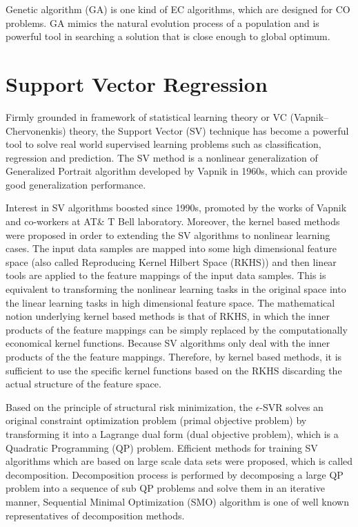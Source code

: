  Genetic algorithm (GA) is one kind of EC algorithms, which are designed for CO problems. GA mimics the natural evolution process of a population and is powerful tool in searching a solution that is close enough to global optimum\cite{Goldberg:1989:GAS:534133}.
 
 \section{Support Vector Regression}
 
 Firmly grounded in framework of statistical learning theory or VC (Vapnik--Chervonenkis) theory, the Support Vector (SV) technique has become a powerful tool to solve real world supervised learning problems such as classification, regression and prediction. The SV method is a nonlinear generalization of Generalized Portrait algorithm developed by Vapnik in 1960s\cite{vapnik1963pattern}\cite{vapnik1964note}, which can provide good generalization performance\cite{scholkopf2002learning}.

Interest in SV algorithms boosted since 1990s, promoted by the works of Vapnik and co-workers at AT\& T Bell laboratory\cite{boser1992training}\cite{guyon1993automatic}\cite{vapnik2013nature}\cite{cortes1995support}\cite{scholkopf1996incorporating}\cite{vapnik1996support}.
Moreover, the kernel based methods\cite{scholkopf2002learning} were proposed in order to extending the SV algorithms to nonlinear learning cases. The input data samples are mapped into some high dimensional feature space (also called Reproducing Kernel Hilbert Space (RKHS)) and then linear tools are applied to the feature mappings of the input data samples. This is equivalent to transforming the nonlinear learning tasks in the original space into the linear learning tasks in high dimensional feature space. The mathematical notion underlying kernel based methods is that of RKHS\cite{scholkopf2002learning}, in which the inner products of the feature mappings can be simply replaced by the computationally economical kernel functions. Because SV algorithms only deal with the inner products of the the feature mappings. Therefore, by kernel based methods, it is sufficient to use the specific kernel functions based on the RKHS discarding the actual structure of the feature space.   
 
Based on the principle of structural risk minimization\cite{vapnik1982estimation}, the $\epsilon$-SVR\cite{vapnik2013nature}\cite{smola2004tutorial} solves an original constraint optimization problem (primal objective problem) by transforming it into a Lagrange dual form (dual objective problem), which is a Quadratic Programming (QP) problem. Efficient methods for training SV algorithms which are based on large scale data sets were proposed, which is called decomposition. Decomposition process is performed by decomposing a large QP problem into a sequence of sub QP problems and solve them in an iterative manner\cite{osuna1997training}\cite{osuna1997improved}, Sequential Minimal Optimization (SMO) algorithm\cite{platt1999fast} is one of well known representatives of decomposition methods. 


